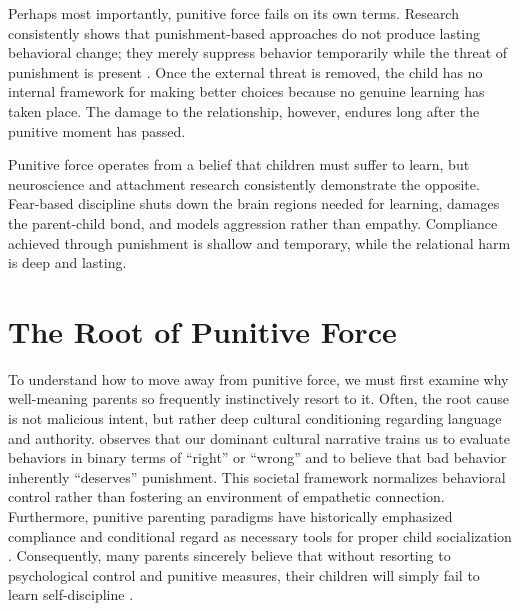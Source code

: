 Perhaps most importantly, punitive force fails on its own terms.
Research consistently shows that punishment-based approaches do not produce lasting behavioral change; they merely suppress behavior temporarily while the threat of punishment is present \citep{gottman1997}.
Once the external threat is removed, the child has no internal framework for making better choices because no genuine learning has taken place.
The damage to the relationship, however, endures long after the punitive moment has passed.

\begin{keyinsight}
Punitive force operates from a belief that children must suffer to learn, but neuroscience and attachment research consistently demonstrate the opposite.
Fear-based discipline shuts down the brain regions needed for learning, damages the parent-child bond, and models aggression rather than empathy.
Compliance achieved through punishment is shallow and temporary, while the relational harm is deep and lasting.
\end{keyinsight}

\section{The Root of Punitive Force}

To understand how to move away from punitive force, we must first examine why well-meaning parents so frequently instinctively resort to it.
Often, the root cause is not malicious intent, but rather deep cultural conditioning regarding language and authority.
\citet{rosenberg2003} observes that our dominant cultural narrative trains us to evaluate behaviors in binary terms of ``right'' or ``wrong'' and to believe that bad behavior inherently ``deserves'' punishment.
This societal framework normalizes behavioral control rather than fostering an environment of empathetic connection.
Furthermore, punitive parenting paradigms have historically emphasized compliance and conditional regard as necessary tools for proper child socialization \citep{kohn2005}.
Consequently, many parents sincerely believe that without resorting to psychological control and punitive measures, their children will simply fail to learn self-discipline \citep{soenens2010}.

